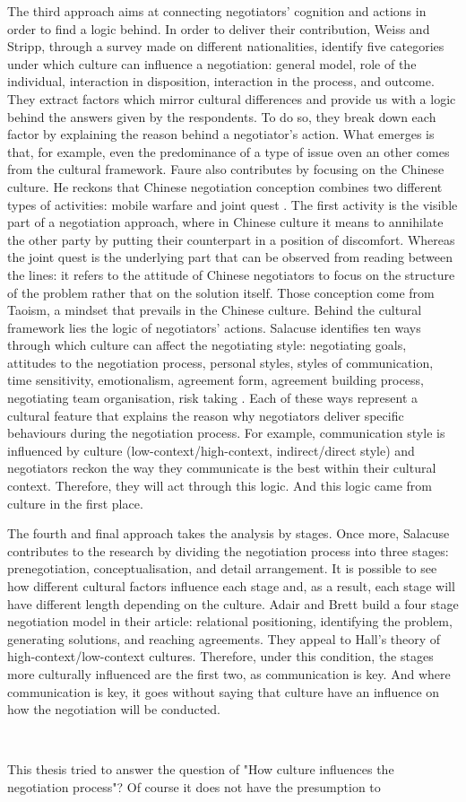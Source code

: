 \documentclass[../main.tex]{subfiles}
\begin{document}
The third approach aims at connecting negotiators' cognition and actions in order to find a logic behind.
In order to deliver their contribution, Weiss and Stripp, through a survey made on different nationalities, identify five categories under which culture can influence a negotiation: general model, role of the individual, interaction in disposition, interaction in the process, and outcome. They extract factors which mirror cultural differences and provide us with a logic behind the answers given by the respondents. To do so, they break down each factor by explaining the reason behind a negotiator's action. What emerges is that, for example, even the predominance of a type of issue oven an other comes from the cultural framework.
Faure also contributes by focusing on the Chinese culture. He reckons that Chinese negotiation conception combines two different types of activities: mobile warfare and joint quest \autocite[140]{faure1}. The first activity is the visible part of a negotiation approach, where in Chinese culture it means to annihilate the other party by putting their counterpart in a position of discomfort. Whereas the joint quest is the underlying part that can be observed from reading between the lines: it refers to the attitude of Chinese negotiators to focus on the structure of the problem rather that on the solution itself. Those conception come from Taoism, a mindset that prevails in the Chinese culture. Behind the cultural framework lies the logic of negotiators' actions.
Salacuse identifies ten ways through which culture can affect the negotiating style: negotiating goals, attitudes to the negotiation process, personal styles, styles of communication, time sensitivity, emotionalism, agreement form, agreement building process, negotiating team organisation, risk taking \autocite[223-224]{salacuse}. Each of these ways represent a cultural feature that explains the reason why negotiators deliver specific behaviours during the negotiation process. For example, communication style is influenced by culture (low-context/high-context, indirect/direct style) and negotiators reckon the way they communicate is the best within their cultural context. Therefore, they will act through this logic. And this logic came from culture in the first place.

The fourth and final approach takes the analysis by stages. Once more, Salacuse contributes to the research by dividing the negotiation process into three stages: prenegotiation, conceptualisation, and detail arrangement. It is possible to see how different cultural factors influence each stage and, as a result, each stage will have different length depending on the culture.
Adair and Brett build a four stage negotiation model in their article: relational positioning, identifying the problem, generating solutions, and reaching agreements. They appeal to Hall's theory of high-context/low-context cultures. Therefore, under this condition, the stages more culturally influenced are the first two, as communication is key. And where communication is key, it goes without saying that culture have an influence on how the negotiation will be conducted.

\


This thesis tried to answer the question of "How culture influences the negotiation process"? Of course it does not have the presumption to %
\end{document}
